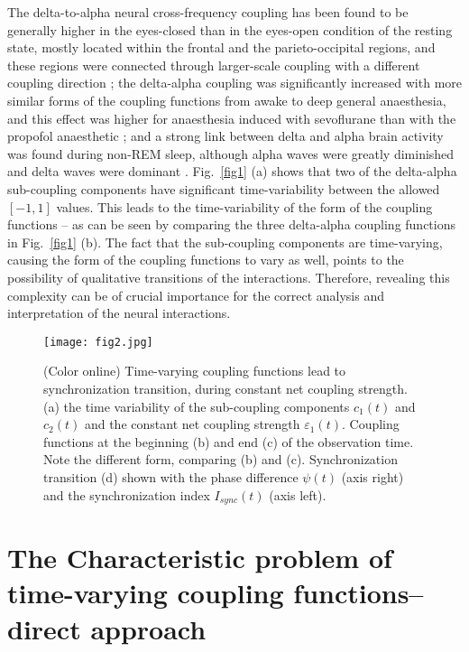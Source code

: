 \documentclass[pre,aps,twocolumn,showpacs]{revtex4}
\newcommand{\red}[1]{{\color{red}{#1}}}
\begin{document}
The delta-to-alpha neural cross-frequency coupling has been found to be generally higher in the eyes-closed than in the eyes-open condition of the resting state,  mostly located within the frontal \red{(e.g.\ at Fp1)} and the parieto-occipital regions, and these regions were connected through larger-scale coupling with a different coupling direction \cite{Jirsa:13}; the delta-alpha coupling was significantly increased with more similar forms of the coupling functions from awake to deep general anaesthesia, and this effect was higher for anaesthesia induced with sevoflurane than with the propofol anaesthetic \cite{Stankovski:16}; and
a strong link between delta and alpha brain activity was found during non-REM sleep, although alpha
waves were greatly diminished and delta waves were dominant \cite{Bashan:12}. Fig.\ \ref{fig1} (a) shows that two of the delta-alpha sub-coupling components have significant time-variability between the allowed $[-1,1]$ values. This leads to the time-variability of the form of the coupling functions  -- as can be seen by comparing the three delta-alpha coupling functions in Fig.\ \ref{fig1} (b). The fact that the sub-coupling components are time-varying, causing the form of the coupling functions to vary as well, points to the possibility of qualitative transitions of the interactions. Therefore, revealing this complexity can be of crucial importance for the correct analysis and interpretation of the neural interactions.

\begin{figure*}
{\caption{(Color online) Time-varying coupling functions lead to synchronization transition, during constant net coupling strength. (a) the time variability of the sub-coupling components $c_1(t)$ and $c_2(t)$ and the constant net coupling strength $\varepsilon_1(t)$. Coupling functions at the beginning (b) and end (c) of the observation time. Note the different form, comparing (b) and (c). Synchronization transition (d) shown with the phase difference $\psi(t)$ (axis right) and the synchronization index $I_{sync}(t)$ (axis left).  \label{fig2} }}
{\texttt{[image: fig2.jpg]}}
\end{figure*}

\section{The Characteristic problem of time-varying coupling functions-- direct approach}
\end{document}
